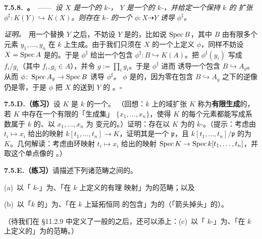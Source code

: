 \textbf{7.5.8.\ \trhProposition。}\ ——\ \emph{设 $X$ 是一个\trIntegral{}的 $k$-\trScheme，%
$Y$ 是一个\trIntegral\trFiniteType{}的 $k$-\trScheme，并给定一个保持 $k$ 的%
\trFunctionField{}扩张 $\phi^{\sharp}\colon K(Y)\hookrightarrow K(X)$。则存在 $k$-\trScheme{}%
的一个\trDominant{}\trRationalMap{} $\phi\colon X\dashrightarrow Y$ 诱导 $\phi^{\sharp}$。}

\emph{证明。}\ 用一个\trOpenSubset{}替换 $Y$ 之后，不妨设 $Y$ 是\trAffine{}的，比如说%
$\operatorname{Spec} B$，其中 $B$ 由有限多个元素 $y_1,\dots,y_n$ 在 $k$ 上生成。由于我们只须在 $X$ %
的一个\trOpenSubset{}上定义 $\phi$，同样不妨设 $X=\operatorname{Spec} A$ 是\trAffine{}的。于是%
$\phi^{\sharp}$ 给出一个包含 $\phi^{\sharp}\colon B\hookrightarrow K(A)$。把 $\phi^{\sharp}(y_i)$ %
写成 $f_i/g_i$（其中 $f_i,g_i\in A$），并令 $g:=\prod_i g_i$。于是 $\phi^{\sharp}$ 进而%
诱导一个包含 $B\hookrightarrow A_g$。从而 $\phi\colon\operatorname{Spec} A_g\to\operatorname{Spec} B$ 诱导%
$\phi^{\sharp}$。\trMorphism{} $\phi$ 是\trDominant{}的，因为零\trIdeal{}在包含 $B\hookrightarrow A_g$ %
之下的逆像仍是零\trIdeal，于是 $\phi$ 把 $X$ 的\trGenericPoint{}送到 $Y$ 的%
\trGenericPoint。\hfill$\square$

\textbf{7.5.D.（练习）}\quad 设 $K$ 是 $k$ 的一个\trFinitelyGenerated\trFieldExtension。%
（回想：$k$ 上的域扩张 $K$ 称为\textbf{有限生成}的，若 $K$ 中存在一个有限的「生成集」%
$\{x_1,\dots,x_n\}$，使得 $K$ 的每个元素都能写成系数属于 $k$ 的、以 $x_1,\dots,x_n$ 为%
变元的\trRationalFunction。）证明：存在以 $K$ 为\trFunctionField{}的\trIrreducible%
\trAffine{} $k$-\trVariety。（提示：考虑由 $t_i\mapsto x_i$ 给出的映射%
$k[t_1,\dots,t_n]\to K$，证明其\trKernel{}是一个\trPrimeIdeal{} $\mathfrak{p}$，且%
$k[t_1,\dots,t_n]/\mathfrak{p}$ 的\trFractionField{}为 $K$。几何解读：考虑由环映射%
$t_i\mapsto x_i$ 给出的映射 $\operatorname{Spec} K\to\operatorname{Spec} k[t_1,\dots,t_n]$，并取这个单点像的%
\trClosure。）

\textbf{7.5.E.（练习）}\quad 请描述下列诸范畴之间的\trEquivalenceOfCategories。

(a)~以「\trIntegral\trAffine{} $k$-\trVariety」为\trObject、「在 $k$ 上定义的\trDominant{}有理%
映射」为\trMorphism{}的范畴；以及

(b)~以「$k$ 的\trFinitelyGenerated\trFieldExtension」为\trObject、「在 $k$ 上延拓恒同%
的包含」为\trMorphism{}的（「箭头掉头」的）\trOppositeCategory。

（待我们在 \S11.2.9 中定义了一般的\trVariety{}之后，还可以添上：(c)~以「\trIntegral{} %
$k$-\trVariety」为\trObject、「在 $k$ 上定义的\trDominant{}\trRationalMap{}」为\trMorphism{}的范畴。）


